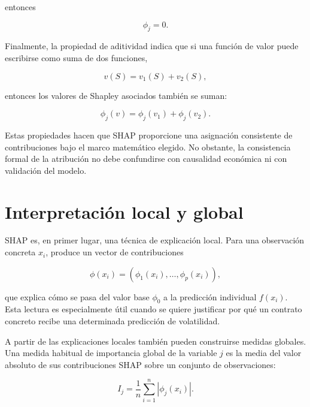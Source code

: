 entonces

\begin{equation}
\phi_j = 0.
\end{equation}

Finalmente, la propiedad de aditividad indica que si una función de valor puede escribirse como suma de dos funciones,

\begin{equation}
v(S) = v_1(S) + v_2(S),
\label{eq:shap-additivity-property}
\end{equation}

entonces los valores de Shapley asociados también se suman:

\begin{equation}
\phi_j(v) = \phi_j(v_1) + \phi_j(v_2).
\label{eq:shap-additivity-values}
\end{equation}

Estas propiedades hacen que SHAP proporcione una asignación consistente de contribuciones bajo el marco matemático elegido. No obstante, la consistencia formal de la atribución no debe confundirse con causalidad económica ni con validación del modelo.

\section{Interpretación local y global}

SHAP es, en primer lugar, una técnica de explicación local. Para una observación concreta \(x_i\), produce un vector de contribuciones

\begin{equation}
\phi(x_i)
=
\left(
\phi_1(x_i),
\ldots,
\phi_p(x_i)
\right),
\label{eq:shap-vector}
\end{equation}

que explica cómo se pasa del valor base \(\phi_0\) a la predicción individual \(f(x_i)\). Esta lectura es especialmente útil cuando se quiere justificar por qué un contrato concreto recibe una determinada predicción de volatilidad.

A partir de las explicaciones locales también pueden construirse medidas globales. Una medida habitual de importancia global de la variable \(j\) es la media del valor absoluto de sus contribuciones SHAP sobre un conjunto de observaciones:

\begin{equation}
I_j =
\frac{1}{n}
\sum_{i=1}^{n}
|\phi_j(x_i)|.
\label{eq:shap-global-importance}
\end{equation}

